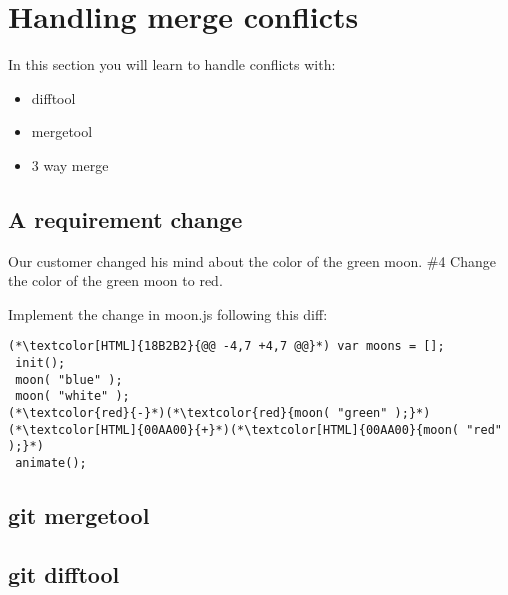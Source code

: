 \section{Handling merge conflicts}
\begin{frame}[fragile]
    \slidetitle
  In this section you will learn to handle conflicts with:
  \begin{itemize}
\item difftool
\item mergetool
\item 3 way merge
\end{itemize}
\end{frame}

\subsection{A requirement change}
\begin{frame}[fragile]
    \subslidetitle
  Our customer changed his mind about the color of the green moon.
  \newline \vspace{1em}
  \#4 Change the color of the green moon to red.

  Implement the change in moon.js following this diff:
\begin{lstlisting}
(*\textcolor[HTML]{18B2B2}{@@ -4,7 +4,7 @@}*) var moons = [];
 init();
 moon( "blue" );
 moon( "white" );
(*\textcolor{red}{-}*)(*\textcolor{red}{moon( "green" );}*)
(*\textcolor[HTML]{00AA00}{+}*)(*\textcolor[HTML]{00AA00}{moon( "red" );}*)
 animate();
\end{lstlisting}

\end{frame}

\subsection{git mergetool}
\begin{frame}[fragile]
    \subslidetitle
\end{frame}

\subsection{git difftool}
\begin{frame}[fragile]
    \subslidetitle
\end{frame}

